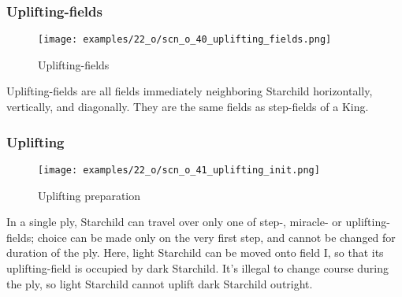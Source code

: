 \vspace*{-0.9\baselineskip}
\subsubsection*{Uplifting-fields}
\label{sec:One/Starchild/Sense-journey/Uplifting-fields}

\vspace*{-0.9\baselineskip}
\noindent
\begin{wrapfigure}[5]{l}{0.4\textwidth}
\centering
\texttt{[image: examples/22\_o/scn\_o\_40\_uplifting\_fields.png]}
\vspace*{-0.4\baselineskip}
\caption{Uplifting-fields}
\label{fig:scn_o_40_uplifting_fields}
\end{wrapfigure}
Uplifting-fields are all fields immediately neighboring Starchild horizontally,
vertically, and diagonally. They are the same fields as step-fields of a King.

\vspace*{1.3\baselineskip}

\subsubsection*{Uplifting}
\label{sec:One/Starchild/Sense-journey/Uplifting}

\vspace*{-0.9\baselineskip}
\noindent
\begin{wrapfigure}[9]{l}{0.4\textwidth}
\centering
\texttt{[image: examples/22\_o/scn\_o\_41\_uplifting\_init.png]}
\vspace*{-0.4\baselineskip}
\caption{Uplifting preparation}
\label{fig:scn_o_41_uplifting_init}
\end{wrapfigure}
In a single ply, Starchild can travel over only one of step-, miracle- or uplifting-fields;
choice can be made only on the very first step, and cannot be changed for duration of the
ply. \newline
\indent
Here, light Starchild can be moved onto field I, so that its uplifting-field is occupied
by dark Starchild. It's illegal to change course during the ply, so light Starchild cannot
uplift dark Starchild outright.

\clearpage %

